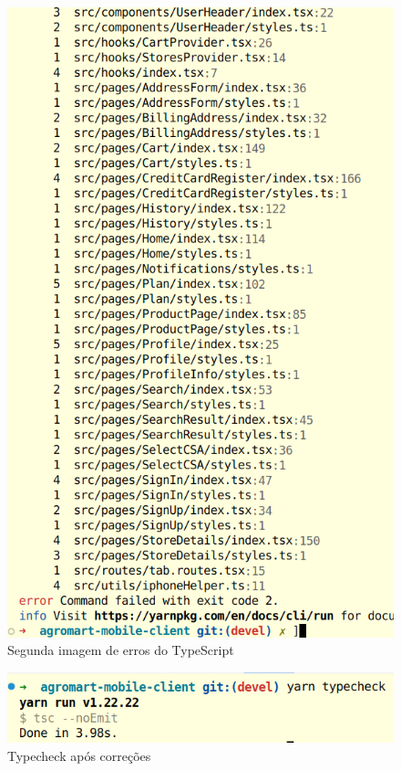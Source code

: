 \begin{figure}[h]
	\centering
	\includegraphics[keepaspectratio=true,scale=0.4]{figuras/tserrors2.png}
	\caption{Segunda imagem de erros do TypeScript}
	\label{erro-ts-2}
\end{figure}

\begin{figure}[h]
	\centering
	\includegraphics[keepaspectratio=true,scale=0.4]{figuras/tscorrigido.png}
	\caption{Typecheck após correções}
	\label{ts-corrigido}
\end{figure}


